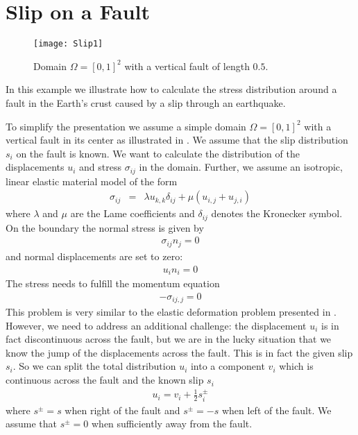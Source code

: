 \section{Slip on a Fault}\label{Slip CHAP}
\begin{figure}[ht]
\centerline{\texttt{[image: Slip1]}}
\caption{Domain $\Omega=[0,1]^2$ with a vertical fault of length $0.5$.}
\label{fig:slip.1}
\end{figure}
%
In this example we illustrate how to calculate the stress distribution around
a fault in the Earth's crust caused by a slip through
an earthquake.

To simplify the presentation we assume a simple domain $\Omega=[0,1]^2$ with
a vertical fault in its center as illustrated in .
We assume that the slip distribution $s_{i}$ on the fault is known.
We want to calculate the distribution of the displacements $u_{i}$
and stress $\sigma_{ij}$ in the domain.
Further, we assume an isotropic, linear elastic material model of the form
\begin{eqnarray} \label{Slip  stress}
\sigma_{ij} & = & \lambda u_{k,k} \delta_{ij} + \mu ( u_{i,j} + u_{j,i})
\end{eqnarray}
where $\lambda$ and $\mu$ are the Lame coefficients
and $\delta_{ij}$ denotes the Kronecker symbol.
On the boundary the normal stress is given by
\begin{eqnarray} \label{Slip natural fault}
\sigma_{ij}n_{j}=0
\end{eqnarray}
and normal displacements are set to zero:
\begin{eqnarray} \label{Slip constraint}
u_{i}n_{i} =0
\end{eqnarray}
The stress needs to fulfill the momentum equation
\begin{eqnarray}\label{Slip general problem}
- \sigma_{ij,j}=0
\end{eqnarray}
This problem is very similar to the elastic deformation problem presented in .
However, we need to address an additional challenge: the displacement
$u_{i}$ is in fact discontinuous across the fault, but we are in the
lucky situation that we know the jump of the displacements across the fault.
This is in fact the given slip $s_{i}$.
So we can split the total distribution $u_{i}$ into a component
$v_{i}$ which is continuous across the fault and the known slip $s_{i}$
\begin{eqnarray}\label{Slip Split}
u_{i} = v_{i} + \frac{1}{2} s^{\pm}_{i}
\end{eqnarray}
where $s^{\pm}=s$ when right of the fault and $s^{\pm}=-s$ when left of the fault.
We assume that $s^{\pm}=0$ when sufficiently away from the fault.

